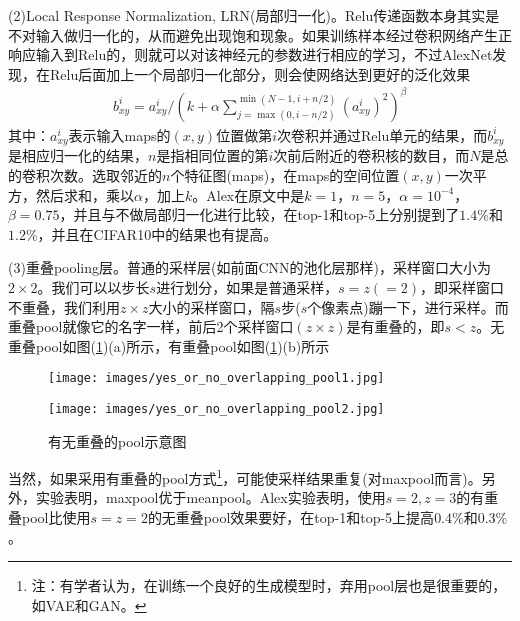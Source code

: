        \par
        (2)Local Response Normalization, LRN(局部归一化)。Relu传递函数本身其实是不对输入做归一化的，从而避免出现饱和现象。如果训练样本经过卷积网络产生正响应输入到Relu的，则就可以对该神经元的参数进行相应的学习，不过AlexNet发现，在Relu后面加上一个局部归一化部分，则会使网络达到更好的泛化效果
        \begin{align*}
        b_{xy}^i = a_{xy}^i\Bigg/ \left( k+\alpha\sum_{j=\max(0,i-n/2)}^{\min (N-1,i+n/2)} (a_{xy}^i)^2\right)^\beta
        \end{align*}
        其中：$a_{xy}^i$表示输入maps的$(x,y)$位置做第$i$次卷积并通过Relu单元的结果，而$b_{xy}^i$是相应归一化的结果，$n$是指相同位置的第$i$次前后附近的卷积核的数目，而$N$是总的卷积次数。选取邻近的$n$个特征图(maps)，在maps的空间位置$(x,y)$一次平方，然后求和，乘以$\alpha$，加上$k$。Alex在原文中是$k=1$，$n=5$，$\alpha=10^{-4}$，$\beta = 0.75$，并且与不做局部归一化进行比较，在top-1和top-5上分别提到了$1.4\%$和$1.2\%$，并且在CIFAR10中的结果也有提高。
        \par
        (3)重叠pooling层。普通的采样层(如前面CNN的池化层那样)，采样窗口大小为$2\times 2$。我们可以以步长$s$进行划分，如果是普通采样，$s=z(=2)$，即采样窗口不重叠，我们利用$z\times z$大小的采样窗口，隔$s$步($s$个像素点)蹦一下，进行采样。而重叠pool就像它的名字一样，前后2个采样窗口$(z\times z)$是有重叠的，即$s<z$。无重叠pool如图(\ref{fig:有无重叠的pool示意图})(a)所示，有重叠pool如图(\ref{fig:有无重叠的pool示意图})(b)所示
            \begin{figure}[H]
              \centering
              \begin{varwidth}[t]{\textwidth}
                \vspace{0pt}
                \texttt{[image: images/yes\_or\_no\_overlapping\_pool1.jpg]}
              \end{varwidth}
              \qquad\qquad
              \begin{varwidth}[t]{\textwidth}
                \vspace{0pt}
                \texttt{[image: images/yes\_or\_no\_overlapping\_pool2.jpg]}
              \end{varwidth}
                \caption{有无重叠的pool示意图}
                \label{fig:有无重叠的pool示意图}
            \end{figure}
        当然，如果采用有重叠的pool方式\footnote{注：有学者认为，在训练一个良好的生成模型时，弃用pool层也是很重要的，如VAE和GAN。}，可能使采样结果重复(对maxpool而言)。另外，实验表明，maxpool优于meanpool。Alex实验表明，使用$s=2,z=3$的有重叠pool比使用$s=z=2$的无重叠pool效果要好，在top-1和top-5上提高$0.4\%$和$0.3\%$。
